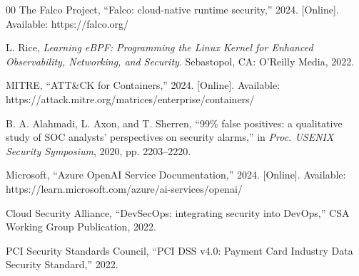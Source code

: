 \documentclass[conference]{IEEEtran}
\begin{document}
\begin{thebibliography}{00}
 The Falco Project, ``Falco: cloud-native runtime security,'' 2024. [Online]. Available: https://falco.org/

 L. Rice, \emph{Learning eBPF: Programming the Linux Kernel for Enhanced Observability, Networking, and Security}. Sebastopol, CA: O'Reilly Media, 2022.

 MITRE, ``ATT\&CK for Containers,'' 2024. [Online]. Available: https://attack.mitre.org/matrices/enterprise/containers/

 B. A. Alahmadi, L. Axon, and T. Sherren, ``99\% false positives: a qualitative study of SOC analysts' perspectives on security alarms,'' in \emph{Proc. USENIX Security Symposium}, 2020, pp. 2203--2220.

 Microsoft, ``Azure OpenAI Service Documentation,'' 2024. [Online]. Available: https://learn.microsoft.com/azure/ai-services/openai/

 Cloud Security Alliance, ``DevSecOps: integrating security into DevOps,'' CSA Working Group Publication, 2022.

 PCI Security Standards Council, ``PCI DSS v4.0: Payment Card Industry Data Security Standard,'' 2022.

\end{thebibliography}
\end{document}
